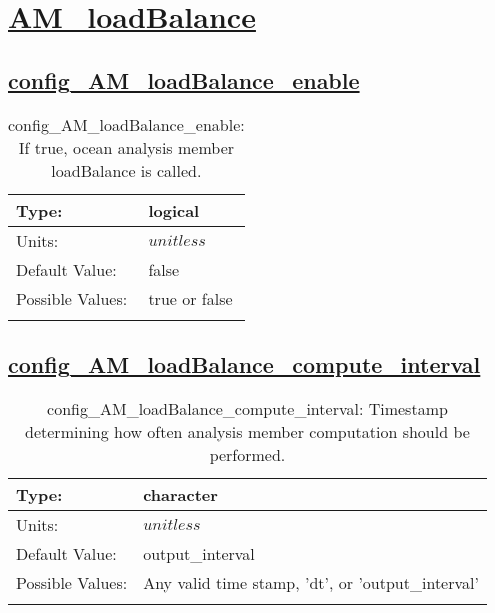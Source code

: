 \section[AM\_loadBalance]{\hyperref[sec:nm_tab_AM_loadBalance]{AM\_loadBalance}}
\label{sec:nm_sec_AM_loadBalance}
\subsection[config\_AM\_loadBalance\_enable]{\hyperref[sec:nm_tab_AM_loadBalance]{config\_AM\_loadBalance\_enable}}
\label{subsec:nm_sec_config_AM_loadBalance_enable}
\begin{center}
\begin{longtable}{| p{2.0in} || p{4.0in} |}
    \hline
    Type: & logical \\
    \hline
    Units: & $unitless$ \\
    \hline
    Default Value: & false \\
    \hline
    Possible Values: & true or false \\
    \hline
    \caption{config\_AM\_loadBalance\_enable: If true, ocean analysis member loadBalance is called.}
\end{longtable}
\end{center}
\subsection[config\_AM\_loadBalance\_compute\_interval]{\hyperref[sec:nm_tab_AM_loadBalance]{config\_AM\_loadBalance\_compute\_interval}}
\label{subsec:nm_sec_config_AM_loadBalance_compute_interval}
\begin{center}
\begin{longtable}{| p{2.0in} || p{4.0in} |}
    \hline
    Type: & character \\
    \hline
    Units: & $unitless$ \\
    \hline
    Default Value: & output\_interval \\
    \hline
    Possible Values: & Any valid time stamp, 'dt', or 'output\_interval' \\
    \hline
    \caption{config\_AM\_loadBalance\_compute\_interval: Timestamp determining how often analysis member computation should be performed.}
\end{longtable}
\end{center}
